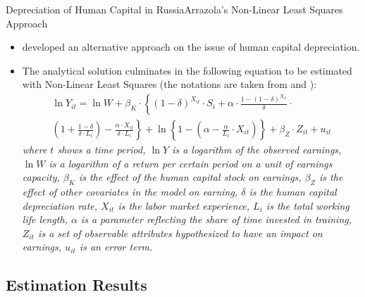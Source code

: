 \documentclass{beamer}
\begin{document}
\begin{frame}{Depreciation of Human Capital in Russia}{Arrazola's Non-Linear Least Squares Approach}
\begin{itemize}
	\item \citet{arrazola_132b._2005} developed an alternative approach on the issue of human capital depreciation.
	\item The analytical solution culminates in the following equation to be estimated with Non-Linear Least Squares (the notations are taken from \citet{weber_173._2008} and \citet{weber_156._2011}):
	\begin{multline}\label{eq:2.16} 
	\ln Y_{i t}= \ln W+\beta_{K} \cdot\left\{(1-\delta)^{X_{i t}} \cdot S_{i}+\alpha \cdot \frac{1-(1-\delta)^{X_{i t}}}{\delta}\right.\cdot\\
	\left.\left(1+\frac{1-\delta}{\delta \cdot L_{i}}\right)-\frac{\alpha \cdot X_{i t}}{\delta \cdot L_{i}}\right\}+\ln \left\{1-\left(\alpha-\frac{\alpha}{L_{i}} \cdot X_{i t}\right)\right\}+\beta_{Z} \cdot Z_{i t}+u_{i t}
	\end{multline}
	\fontsize{7}{8}\selectfont
	\noindent
	\textit{where $t$ shows a time period, $\ln Y$ is a logarithm of the observed earnings, $\ln W$ is a logarithm of a return per certain period on a unit of earnings capacity, $\beta_{K}$ is the effect of the human capital stock on earnings, $\beta_{Z}$ is the effect of other covariates in the model on earning, $\delta$ is the human capital depreciation rate, $X_{i t}$ is the labor market experience, $L_{i}$ is the total working life length, $\alpha$ is a parameter reflecting the share of time invested in training, $Z_{i t}$ is a set of observable attributes hypothesized to have an impact on earnings, $u_{i t}$ is an error term.}
\end{itemize}
\end{frame}

\subsection{Estimation Results}
\end{document}
